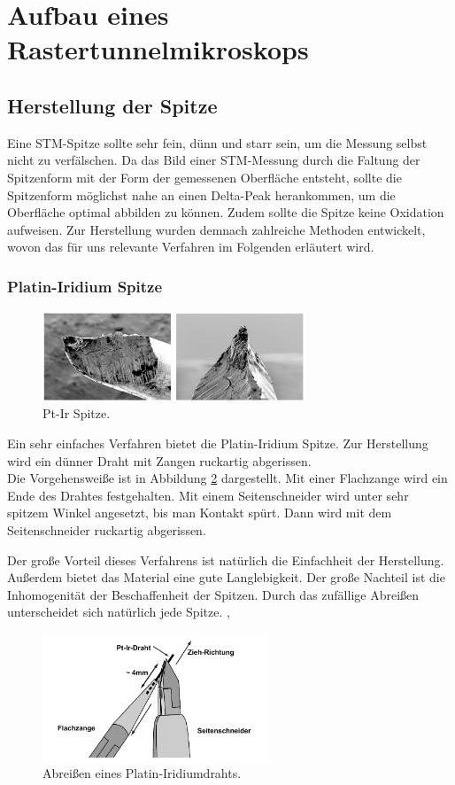 \section{Aufbau eines Rastertunnelmikroskops}
\subsection{Herstellung der Spitze}

Eine STM-Spitze sollte sehr fein, dünn und starr sein, um die Messung selbst nicht zu verfälschen. Da das Bild einer STM-Messung durch die Faltung der Spitzenform mit der Form der gemessenen Oberfläche entsteht, sollte die Spitzenform möglichst nahe an einen Delta-Peak herankommen, um die Oberfläche optimal abbilden zu können. Zudem sollte die Spitze keine Oxidation aufweisen. Zur Herstellung wurden demnach zahlreiche Methoden entwickelt, wovon das für uns relevante Verfahren im Folgenden erläutert wird.


\subsubsection{Platin-Iridium Spitze}

\begin{figure}[h]
	\centering
	\includegraphics[width=0.7\textwidth]{Abb/pt-ir.png}
	\caption{Pt-Ir Spitze. \cite{nanosurf}}
	\label{ptir}
\end{figure}
Ein sehr einfaches Verfahren bietet die Platin-Iridium Spitze. Zur Herstellung wird
ein dünner Draht mit Zangen ruckartig abgerissen.\\
Die Vorgehensweiße ist in Abbildung \ref{ptirverf} dargestellt. Mit einer Flachzange
wird ein Ende des Drahtes festgehalten. Mit einem Seitenschneider wird unter sehr 
spitzem Winkel angesetzt, bis man Kontakt spürt. Dann wird mit dem Seitenschneider
ruckartig abgerissen.

Der große Vorteil dieses Verfahrens ist natürlich die Einfachheit der Herstellung.
Außerdem bietet das Material eine gute Langlebigkeit. Der große Nachteil ist die
Inhomogenität der Beschaffenheit der Spitzen. Durch das zufällige Abreißen 
unterscheidet sich natürlich jede Spitze. \cite{nanosurf}, \cite{beschr}
\begin{figure}[H]
	\centering
	\includegraphics[width=0.6\textwidth]{Abb/pt-it-verf.png}
	\caption{Abreißen eines Platin-Iridiumdrahts. \cite{nanosurf}}
	\label{ptirverf}
\end{figure}

